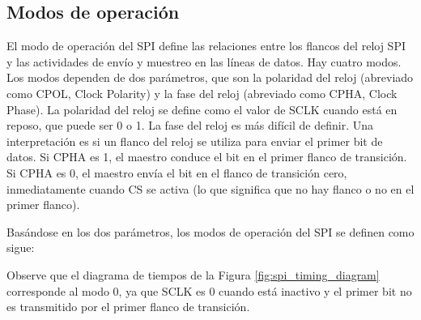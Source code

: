     \subsection{Modos de operación}

    El modo de operación del SPI define las relaciones entre los flancos del reloj SPI y las actividades de envío y muestreo en las líneas de datos. Hay cuatro modos. Los modos dependen de dos parámetros, que son la polaridad del reloj (abreviado como CPOL, Clock Polarity) y la fase del reloj (abreviado como CPHA, Clock Phase). La polaridad del reloj se define como el valor de SCLK cuando está en reposo, que puede ser 0 o 1. La fase del reloj es más difícil de definir. Una interpretación es si un flanco del reloj se utiliza para enviar el primer bit de datos. Si CPHA es 1, el maestro conduce el bit en el primer flanco de transición. Si CPHA es 0, el maestro envía el bit en el flanco de transición cero, inmediatamente cuando CS se activa (lo que significa que no hay flanco o no en el primer flanco).

    Basándose en los dos parámetros, los modos de operación del SPI se definen como sigue:

    \begin{table}[h!]
      \caption{Modos de operación del SPI.}
      \begin{center}
      \label{tab:spi_modes}
      \end{center}
    \end{table}

    Observe que el diagrama de tiempos de la Figura \ref{fig:spi_timing_diagram} corresponde al modo 0, ya que SCLK es 0 cuando está inactivo y el primer bit no es transmitido por el primer flanco de transición.

